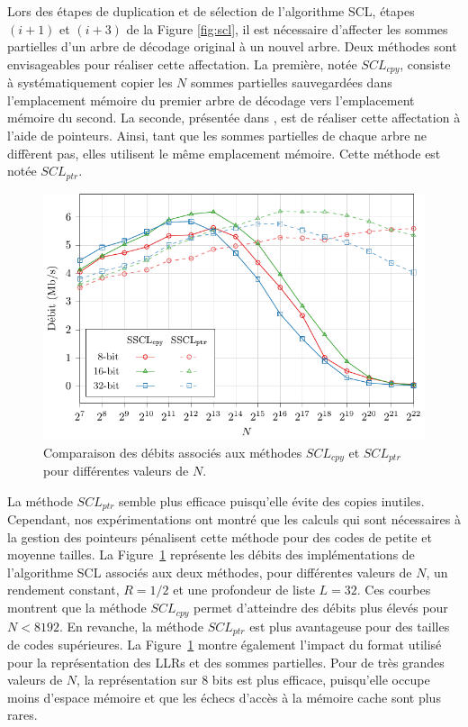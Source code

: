 Lors des étapes de duplication et de sélection de l'algorithme SCL, étapes $(i+1)$ et $(i+3)$ de la Figure \ref{fig:scl}, il est nécessaire d'affecter les sommes partielles d'un arbre de décodage original à un nouvel arbre. Deux méthodes sont envisageables pour réaliser cette affectation. La première, notée $SCL_{cpy}$, consiste à systématiquement copier les $N$ sommes partielles sauvegardées dans l'emplacement mémoire du premier arbre de décodage vers l'emplacement mémoire du second. La seconde, présentée dans \cite{tal_list_2011}, est de réaliser cette affectation à l'aide de pointeurs. Ainsi, tant que les sommes partielles de chaque arbre ne diffèrent pas, elles utilisent le même emplacement mémoire. Cette méthode est notée $SCL_{ptr}$.

\begin{figure}
\centering
\includegraphics{main/ch2_fig/curves/thr/tikz/thr}
\caption{Comparaison des débits associés aux méthodes $SCL_{cpy}$ et $SCL_{ptr}$ pour différentes valeurs de $N$.}
\label{fig:scl_mem}
\end{figure}

La méthode $SCL_{ptr}$ semble plus efficace puisqu'elle évite des copies inutiles. Cependant, nos expérimentations ont montré que les calculs qui sont nécessaires à la gestion des pointeurs pénalisent cette méthode pour des codes de petite et moyenne tailles. La Figure~\ref{fig:scl_mem} représente les débits des implémentations de l'algorithme SCL associés aux deux méthodes, pour différentes valeurs de $N$, un rendement constant, $R=1/2$ et une profondeur de liste $L=32$. Ces courbes montrent que la méthode $SCL_{cpy}$ permet d'atteindre des débits plus élevés pour $N<8192$. En revanche, la méthode $SCL_{ptr}$ est plus avantageuse pour des tailles de codes supérieures. La Figure~\ref{fig:scl_mem} montre également l'impact du format utilisé pour la représentation des LLRs et des sommes partielles. Pour de très grandes valeurs de $N$, la représentation sur 8 bits est plus efficace, puisqu'elle occupe moins d'espace mémoire et que les échecs d'accès à la mémoire cache sont plus rares. 

